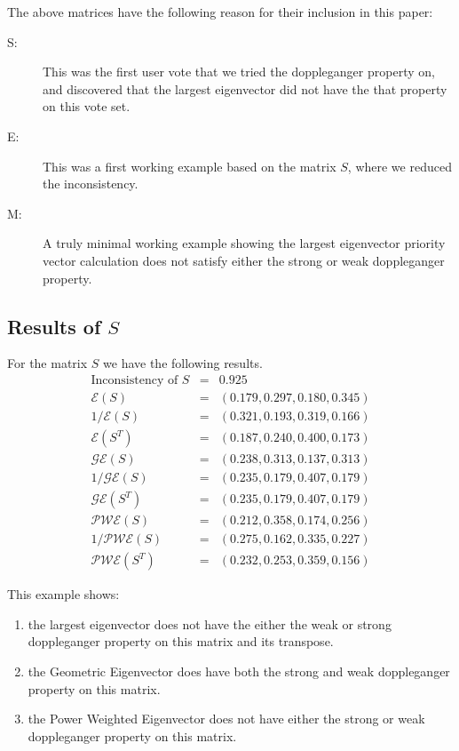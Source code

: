\documentclass[11pt]{article}
\begin{document}
The above matrices have the following reason for their inclusion in this paper:
\begin{framed}
\begin{description}
	\item [S:] This was the first user vote that we tried the doppleganger property on, and discovered that the largest eigenvector did not have the that property on this vote set.
	\item [E:] This was a first working example based on the matrix $S$, where we reduced the inconsistency.
	\item [M:] A truly minimal working example showing the largest eigenvector priority vector calculation does not satisfy either the strong or weak doppleganger property.
\end{description}	
\end{framed}

\subsection{Results of $S$}
For the matrix $S$ we have the following results.
\begin{eqnarray*}
	\mbox{Inconsistency of } S &=& 0.925 \\
	\mathcal{E}(S) &=& (0.179,  0.297,  0.180,   0.345) \\
	1/\mathcal{E}(S) &=& ( 0.321,  0.193,  0.319,  0.166) \\
	\mathcal{E}(S^T) &=& ( 0.187, 0.240,  0.400,  0.173) \\
	\mathcal{GE}(S) &=& ( 0.238,  0.313,  0.137,  0.313) \\
	1/\mathcal{GE}(S) &=& ( 0.235, 0.179,  0.407,  0.179) \\
	\mathcal{GE}(S^T) &=& ( 0.235, 0.179,  0.407,  0.179) \\
	\mathcal{PWE}(S) &=& (0.212,  0.358,   0.174,  0.256) \\
	1/\mathcal{PWE}(S) &=& (0.275,  0.162,  0.335,  0.227) \\
	\mathcal{PWE}(S^T) &=& (0.232,  0.253,  0.359,  0.156)
\end{eqnarray*}

This example shows:
\begin{enumerate}
	\item the largest eigenvector does not have the either the weak
or strong doppleganger property on this matrix and its transpose.  
	\item the Geometric Eigenvector does have both the strong and weak doppleganger property on this matrix.
	\item the Power Weighted Eigenvector does not have either the strong or weak doppleganger property on this matrix.
\end{enumerate}
\end{document}
